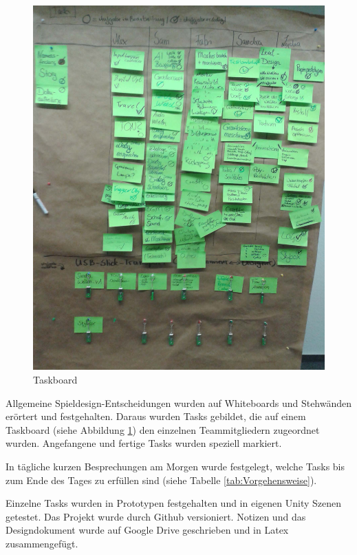 
\begin{figure}[!htbp]
	\centering
		\includegraphics[width=1.0\textwidth]{images/Tasks}
	\caption{Taskboard}
	\label{fig:Tasks}
\end{figure}

Allgemeine Spieldesign-Entscheidungen wurden auf Whiteboards und Stehwänden erörtert und festgehalten. Daraus wurden Tasks gebildet, die auf einem Taskboard (siehe Abbildung \ref{fig:Tasks}) den einzelnen Teammitgliedern zugeordnet wurden. Angefangene und fertige Tasks wurden speziell markiert.

In tägliche kurzen Besprechungen am Morgen wurde festgelegt, welche Tasks bis zum Ende des Tages zu erfüllen sind (siehe Tabelle \ref{tab:Vorgehensweise}).

Einzelne Tasks wurden in Prototypen festgehalten und in eigenen Unity Szenen getestet. Das Projekt wurde durch Github versioniert. Notizen und das Designdokument wurde auf Google Drive geschrieben und in Latex zusammengefügt.

